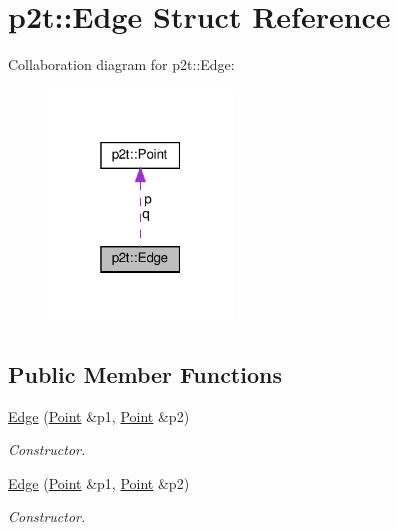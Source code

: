 \hypertarget{structp2t_1_1Edge}{}\section{p2t\+:\+:Edge Struct Reference}
\label{structp2t_1_1Edge}


Collaboration diagram for p2t\+:\+:Edge\+:
\nopagebreak
\begin{figure}[H]
\begin{center}
\leavevmode
\includegraphics[width=139pt]{structp2t_1_1Edge__coll__graph}
\end{center}
\end{figure}
\subsection*{Public Member Functions}
\begin{DoxyCompactItemize}
\item 
\mbox{\label{structp2t_1_1Edge_af5d8d51f97093c617c61a2a8618ec046}} 
\hyperlink{structp2t_1_1Edge_af5d8d51f97093c617c61a2a8618ec046}{Edge} (\hyperlink{structp2t_1_1Point}{Point} \&p1, \hyperlink{structp2t_1_1Point}{Point} \&p2)
\begin{DoxyCompactList}\small\item\em Constructor. \end{DoxyCompactList}\item 
\mbox{\label{structp2t_1_1Edge_af5d8d51f97093c617c61a2a8618ec046}} 
\hyperlink{structp2t_1_1Edge_af5d8d51f97093c617c61a2a8618ec046}{Edge} (\hyperlink{structp2t_1_1Point}{Point} \&p1, \hyperlink{structp2t_1_1Point}{Point} \&p2)
\begin{DoxyCompactList}\small\item\em Constructor. \end{DoxyCompactList}\end{DoxyCompactItemize}
